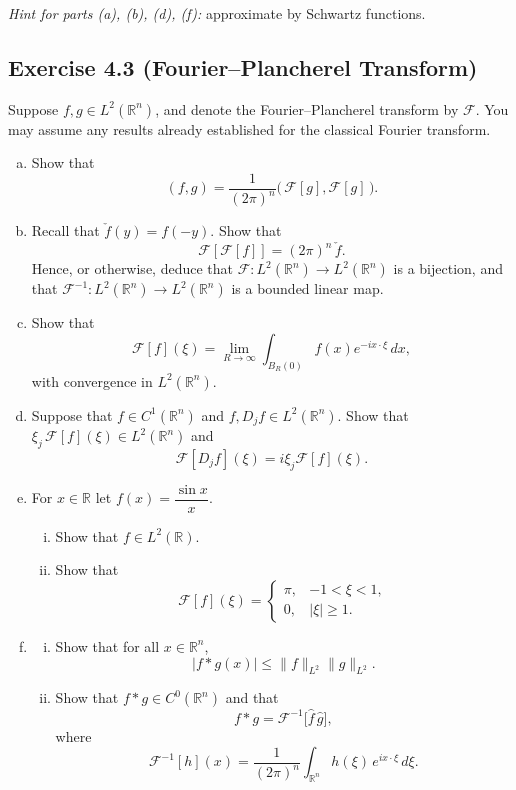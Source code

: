 \documentclass[12pt,a4paper]{article}
\theoremstyle{plain}
\theoremstyle{definition}
\theoremstyle{remark}
\theoremstyle{remark}
\begin{document}
\medskip
\noindent\emph{Hint for parts (a), (b), (d), (f):} approximate by Schwartz functions.

\subsection*{Exercise 4.3 (Fourier--Plancherel Transform)}

Suppose $f,g\in L^{2}(\mathbb{R}^{n})$, and denote the Fourier--Plancherel
transform by $\mathcal{F}$.  You may assume any results already established
for the classical Fourier transform.

\begin{enumerate}[(a)]
	
	\item Show that
	\[
	(f,g)
	= \frac{1}{(2\pi)^{n}}
	\bigl(\,\mathcal{F}[g],\mathcal{F}[g]\,\bigr).
	\]
	
	\item Recall that $\check{f}(y)=f(-y)$.  Show that
	\[
	\mathcal{F}[\mathcal{F}[f]] = (2\pi)^{n}\,\check{f}.
	\]
	Hence, or otherwise, deduce that
	$\mathcal{F}:L^{2}(\mathbb{R}^{n})\to L^{2}(\mathbb{R}^{n})$ is a bijection,
	and that
	$\mathcal{F}^{-1}:L^{2}(\mathbb{R}^{n})\to L^{2}(\mathbb{R}^{n})$ is a
	bounded linear map.
	
	\item Show that
	\[
	\mathcal{F}[f](\xi)
	= \lim_{R\to\infty} \int_{B_{R}(0)} f(x)e^{-ix\cdot\xi}\,dx,
	\]
	with convergence in $L^{2}(\mathbb{R}^{n})$.
	
	\item Suppose that $f\in C^{1}(\mathbb{R}^{n})$ and
	$f, D_{j}f\in L^{2}(\mathbb{R}^{n})$.  Show that
	$\xi_{j}\,\mathcal{F}[f](\xi)\in L^{2}(\mathbb{R}^{n})$ and
	\[
	\mathcal{F}[D_{j}f](\xi)
	= i\xi_{j}\mathcal{F}[f](\xi).
	\]
	
	\item For $x\in\mathbb{R}$ let $f(x)=\dfrac{\sin x}{x}$.
	\begin{enumerate}[i.]
		\item Show that $f\in L^{2}(\mathbb{R})$.
		\item Show that
		\[
		\mathcal{F}[f](\xi)
		=
		\begin{cases}
			\pi, & -1<\xi<1,\\[0.3em]
			0,   & |\xi|\ge 1.
		\end{cases}
		\]
	\end{enumerate}
	
	\item
	\begin{enumerate}[i.]
		\item Show that for all $x\in\mathbb{R}^{n}$,
		\[
		|f*g(x)| \le \|f\|_{L^{2}}\|g\|_{L^{2}}.
		\]
		
		\item Show that $f*g\in C^{0}(\mathbb{R}^{n})$ and that
		\[
		f*g = \mathcal{F}^{-1}\bigl[\widehat{f}\,\widehat{g}\bigr],
		\]
		where
		\[
		\mathcal{F}^{-1}[h](x)
		= \frac{1}{(2\pi)^{n}} \int_{\mathbb{R}^{n}} h(\xi)\,e^{ix\cdot\xi}\,d\xi.
		\]
	\end{enumerate}
	
\end{enumerate}
\end{document}
